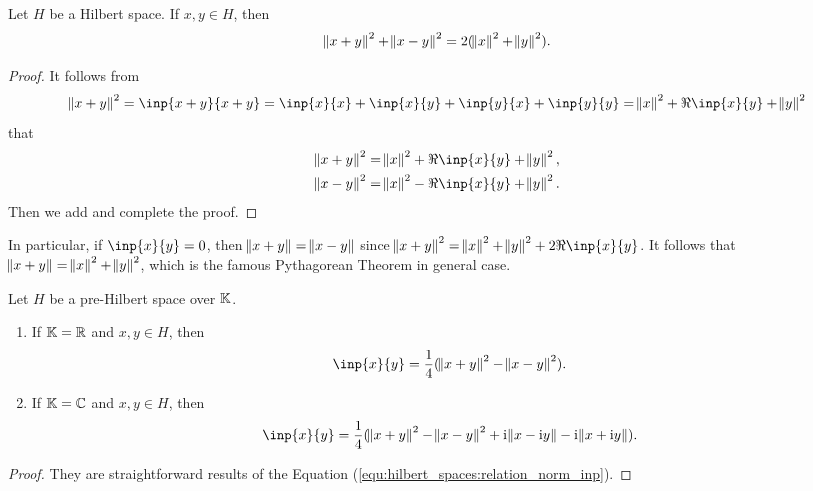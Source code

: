 \begin{thm}
Let $H$ be a Hilbert space. 
If $x, y \in H$, then 
\begin{equation*}
    \norm{x + y}^2 + \norm{x - y}^2 = 2(\norm{x}^2 + \norm{y}^2). 
\end{equation*}
\end{thm}
\begin{proof}
It follows from 
\begin{equation*}
    \norm{x + y}^2 = \inp{x + y}{x + y} 
    = \inp{x}{x} + \inp{x}{y} + \inp{y}{x} + \inp{y}{y} 
    = \norm{x}^2 + \Re\inp{x}{y} + \norm{y}^2
\end{equation*}
that 
\begin{equation}
    \label{equ:hilbert_spaces:relation_norm_inp}
    \begin{aligned}
        \norm{x + y}^2 = \norm{x}^2 + \Re\inp{x}{y} + \norm{y}^2, \\
        \norm{x - y}^2 = \norm{x}^2 - \Re\inp{x}{y} + \norm{y}^2.
    \end{aligned}
\end{equation}
Then we add and complete the proof. 
\end{proof}

In particular, if $\inp{x}{y} = 0$, then $\norm{x + y} = \norm{x - y}$ since 
$\norm{x + y}^2 = \norm{x}^2 + \norm{y}^2 + 2 \Re \inp{x}{y}$. 
It follows that $\norm{x + y} = \norm{x}^2 + \norm{y}^2$, which is the 
famous Pythagorean Theorem in general case. 

\begin{thm}
\label{thm:hilbert_space:polarization_identity}
Let $H$ be a pre-Hilbert space over $\mathbb{K}$. 
\begin{enumerate}
    \item \label{thm:hilbert_space:polarization_identity:1}
    If $\mathbb{K} = \mathbb{R}$ and $x, y \in H$, then 
    \begin{equation}
        \label{equ:hilbert_spaces:polarization_identity:1}
        \inp{x}{y} = \frac{1}{4} (\norm{x + y}^2 - \norm{x - y}^2). 
    \end{equation}
    \item \label{thm:hilbert_space:polarization_identity:2}
    If $\mathbb{K} = \mathbb{C}$ and $x, y \in H$, then 
    \begin{equation}
        \label{equ:hilbert_spaces:polarization_identity:2}
        \inp{x}{y} = \frac{1}{4} (\norm{x + y}^2 - \norm{x - y}^2 
            + \mi \norm{x - \mi y} - \mi \norm{x + \mi y}). 
    \end{equation}
\end{enumerate}
\end{thm}
\begin{proof}
They are straightforward results of the Equation 
(\ref{equ:hilbert_spaces:relation_norm_inp}). 
\end{proof}

